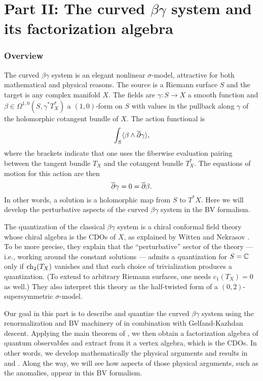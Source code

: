\part*{Part II: The curved $\beta\gamma$ system and its factorization algebra}


\section{Overview}

The curved $\beta\gamma$ system is an elegant nonlinear $\sigma$-model,
attractive for both mathematical and physical reasons.
The source is a Riemann surface $S$ and the target is any complex manifold $X$.
The fields are $\gamma: S \to X$ a smooth function and 
$\beta \in \Omega^{1,0}(S,\gamma^*T^*_X)$ a $(1,0)$-form on $S$ 
with values in the pullback along $\gamma$ of the holomorphic cotangent bundle of $X$.
The action functional is 
\[\int_S \langle \beta \wedge \overline{\partial} \gamma \rangle, \]
where the brackets indicate that one uses the fiberwise evaluation pairing between the tangent bundle $T_X$ and the cotangent bundle $T^*_X$.
The equations of motion for this action are then
\[ \overline{\partial} \gamma = 0 = \overline{\partial} \beta. \]
In other words, a solution is a holomorphic map from $S$ to $T^*X$.
Here we will develop the perturbative aspects of the curved $\beta\gamma$ system in the BV formalism.

The quantization of the classical $\beta\gamma$ system is a chiral conformal field theory whose chiral algebra is the CDOs of $X$,
as explained by Witten \cite{WittenCDO} and Nekrasov \cite{Nek}.
To be more precise, they explain that the ``perturbative'' sector of the 
theory --- i.e., working around the constant solutions --- admits a quantization for $S = \mathbb C$ only if ${\rm ch}_2(T_X)$ vanishes and that each choice of trivialization produces a quantization.
(To extend to arbitrary Riemann surfaces, one needs $c_1(T_X) = 0$ as well.)
They also interpret this theory as the half-twisted form of a $(0,2)$-supersymmetric $\sigma$-model.

Our goal in this part is to describe and quantize the curved $\beta\gamma$ system 
using the renormalization and BV machinery of \cite{CosBook} in combination with Gelfand-Kazhdan descent.
Applying the main theorem of \cite{CG}, we then obtain a factorization algebra of quantum observables 
and extract from it a vertex algebra, which is the CDOs.
In other words, we develop mathematically the physical arguments and results in \cite{WittenCDO} and \cite{Nek}.
Along the way, we will see how aspects of those physical arguments, such as the anomalies,
appear in this BV formalism.

